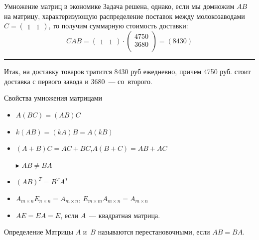\documentclass[unicode,11pt,notheorems]{beamer}
\begin{document}
\begin{frame}[allowframebreaks]{Умножение матриц в экономике}{}
Задача решена, однако, если мы домножим $AB$ на матрицу, характеризующую распределение поставок между молокозаводами $C=\begin{pmatrix}
1 & 1
\end{pmatrix}$, то  получим суммарную стоимость доставки: 
$$
CAB = \begin{pmatrix}
1 & 1
\end{pmatrix} \cdot 
\begin{pmatrix}
4750 \\3680\\
\end{pmatrix}
=(8430)
$$

\hrule
\medskip

Итак, на доставку товаров тратится 8430 руб ежедневно, причем 4750 руб. стоит доставка с первого завода и 3680~--- со~второго.
\end{frame}

\begin{frame}{Свойства умножения  матрицами}{}

\begin{itemize}
\item $A(BC)=(AB)C$
\item $k(AB)=(kA)B=A(kB)$
\item $(A+B)C=AC+BC$,\quad $A(B+C)=AB+AC$
\item[\alert{$\blacktriangleright$}] \alert{$AB\neq BA$} 
\item $(AB)^T=B^TA^T$
\item $A_{m\times n}E_{n\times n} =A_{m\times n}$, $E_{m\times m}A_{m\times n} = A_{m\times n}$
\item $AE = EA=E$, если $A$~--- квадратная матрица.
\end{itemize}
\begin{block}{Определение}
Матрицы $A$ и~$B$ называются \alert{перестановочными}, если $AB = BA$. 
\end{block}
\end{frame}
\end{document}
